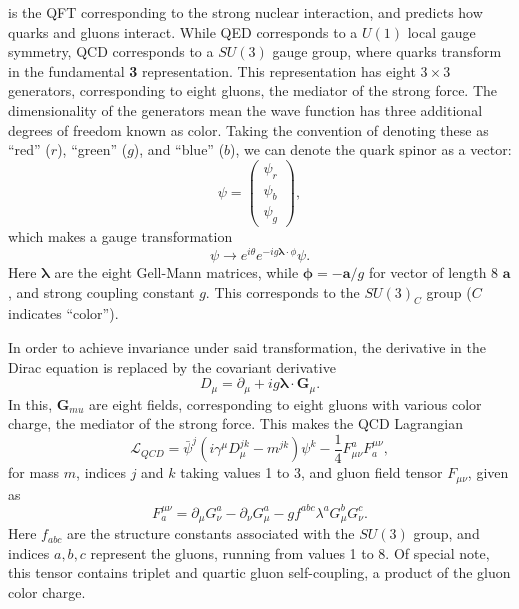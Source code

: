          is the \gls{QFT} corresponding to the strong nuclear interaction, and predicts how quarks and gluons interact. While \gls{QED} corresponds to a $U(1)$ local gauge symmetry, \gls{QCD} corresponds to a $SU(3)$ gauge group, where quarks transform in the fundamental {\bf 3} representation. This representation has eight $3 \times 3$ generators, corresponding to eight gluons, the mediator of the strong force. The dimensionality of the generators mean the wave function has three additional degrees of freedom known as color. Taking the convention of denoting these as ``red'' ($r$), ``green'' ($g$), and ``blue'' ($b$), we can denote the quark spinor as a vector:
        \begin{equation}
            \psi =\begin{pmatrix} \psi_{r} \\ \psi_{b} \\ \psi_{g}\end{pmatrix},
        \end{equation}
        which makes a gauge transformation
        \begin{equation}
        \psi \rightarrow e^{i\theta}e^{-ig {\boldsymbol \lambda\cdot \phi}}\psi.
        \end{equation}
        Here $\boldsymbol \lambda$ are the eight Gell-Mann matrices, while ${\boldsymbol \phi} = -{\boldsymbol a}/g$ for vector of length 8 $\boldsymbol a$, and strong coupling constant $g$. This corresponds to the $SU(3)_C$ group ($C$ indicates ``color'').

        In order to achieve invariance under said transformation, the derivative in the Dirac equation is replaced by the covariant derivative 
        \begin{equation}
            D_{\mu} = \partial_{\mu} + ig {\boldsymbol \lambda\cdot {\boldsymbol G_{\mu}}}.
        \end{equation}
        In this, ${\boldsymbol G_{mu}}$ are eight fields, corresponding to eight gluons with various color charge, the mediator of the strong force. This makes the \gls{QCD} Lagrangian
        \begin{equation}
            \mathcal{L}_{QCD} = \bar{\psi}^j (i \gamma^{\mu} D_{\mu}^{jk} - m^{jk})\psi^{k} - \frac{1}{4} F_{\mu \nu}^{a} F^{\mu \nu}_{a},
        \end{equation}
        for mass $m$, indices $j$ and $k$ taking values 1 to 3, and gluon field tensor $F_{\mu \nu}$, given as
        \begin{equation}
            F^{\mu \nu}_{a} = \partial_{\mu} G_{\nu}^a - \partial_{\nu}G_{\mu}^a - g f^{abc} \lambda^a G_{\mu}^b G_{\nu}^c.
        \end{equation}
        Here $f_{abc}$ are the structure constants associated with the $SU(3)$ group, and indices $a,b,c$ represent the gluons, running from values 1 to 8. Of special note, this tensor contains triplet and quartic gluon self-coupling, a product of the gluon color charge.


